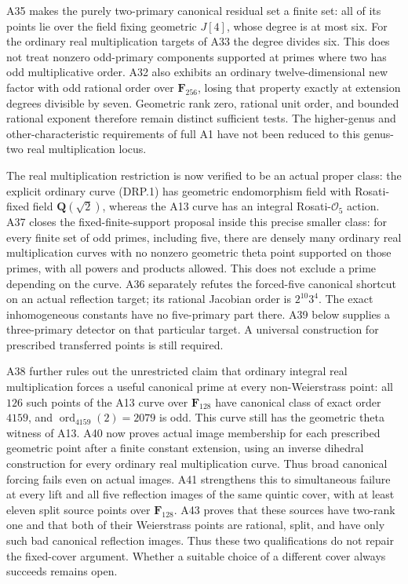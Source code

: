 \documentclass[11pt,a4paper]{article}
\begin{document}
A35 makes the purely two-primary canonical residual set a finite set:
all of its points lie over the field fixing geometric $J[4]$, whose degree
is at most six. For the ordinary real multiplication targets of A33 the
degree divides six. This does not treat nonzero odd-primary components
supported at primes where two has odd multiplicative order. A32 also
exhibits an ordinary twelve-dimensional new factor with odd rational
order over $\mathbf F_{256}$, losing that property exactly at extension
degrees divisible by seven. Geometric rank zero, rational unit order,
and bounded rational exponent therefore remain distinct sufficient tests.
The higher-genus and other-characteristic requirements of full A1 have
not been reduced to this genus-two real multiplication locus.


The real multiplication restriction is now verified to be an actual
proper class: the explicit ordinary curve (DRP.1) has geometric
endomorphism field with Rosati-fixed field $\mathbf Q(\sqrt2)$,
whereas the A13 curve has an integral Rosati-$\mathcal O_5$ action.
A37 closes the fixed-finite-support proposal inside this precise
smaller class: for every finite set of odd primes, including five,
there are densely many ordinary real multiplication curves with no
nonzero geometric theta point supported on those primes, with all
powers and products allowed. This does not exclude a prime depending
on the curve. A36 separately refutes the forced-five canonical
shortcut on an actual reflection target; its rational Jacobian order
is $2^{10}3^4$. The exact inhomogeneous constants have no five-primary
part there. A39 below supplies a three-primary detector on that particular target.
A universal construction for prescribed transferred points is still required.

A38 further rules out the unrestricted claim that ordinary
integral real multiplication forces a useful canonical prime at every
non-Weierstrass point: all $126$ such points of the A13 curve over
$\mathbf F_{128}$ have canonical class of exact order $4159$, and
$\operatorname{ord}_{4159}(2)=2079$ is odd. This curve still has the
geometric theta witness of A13. A40 now proves actual image membership for each prescribed geometric
point after a finite constant extension, using an inverse dihedral
construction for every ordinary real multiplication curve. Thus broad
canonical forcing fails even on actual images. A41 strengthens this to simultaneous failure at every lift and all
five reflection images of the same quintic cover, with at least eleven
split source points over $\mathbf F_{128}$. A43 proves that these
sources have two-rank one and that both of their Weierstrass points are
rational, split, and have only such bad canonical reflection images.
Thus these two qualifications do not repair the fixed-cover argument.
Whether a suitable choice of a different cover always succeeds remains open.
\end{document}

